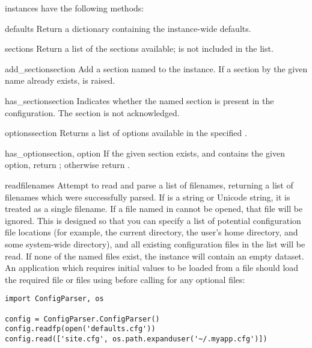  instances have the following methods:

\begin{methoddesc}{defaults}{}
Return a dictionary containing the instance-wide defaults.
\end{methoddesc}

\begin{methoddesc}{sections}{}
Return a list of the sections available;  is not
included in the list.
\end{methoddesc}

\begin{methoddesc}{add_section}{section}
Add a section named  to the instance.  If a section by
the given name already exists,  is
raised.
\end{methoddesc}

\begin{methoddesc}{has_section}{section}
Indicates whether the named section is present in the
configuration. The  section is not acknowledged.
\end{methoddesc}

\begin{methoddesc}{options}{section}
Returns a list of options available in the specified .
\end{methoddesc}

\begin{methoddesc}{has_option}{section, option}
If the given section exists, and contains the given option,
return ; otherwise return .
\end{methoddesc}

\begin{methoddesc}{read}{filenames}
Attempt to read and parse a list of filenames, returning a list of filenames
which were successfully parsed.  If  is a string or
Unicode string, it is treated as a single filename.
If a file named in  cannot be opened, that file will be
ignored.  This is designed so that you can specify a list of potential
configuration file locations (for example, the current directory, the
user's home directory, and some system-wide directory), and all
existing configuration files in the list will be read.  If none of the
named files exist, the  instance will contain an
empty dataset.  An application which requires initial values to be
loaded from a file should load the required file or files using
 before calling  for any optional
files:

\begin{verbatim}
import ConfigParser, os

config = ConfigParser.ConfigParser()
config.readfp(open('defaults.cfg'))
config.read(['site.cfg', os.path.expanduser('~/.myapp.cfg')])
\end{verbatim}
\end{methoddesc}

